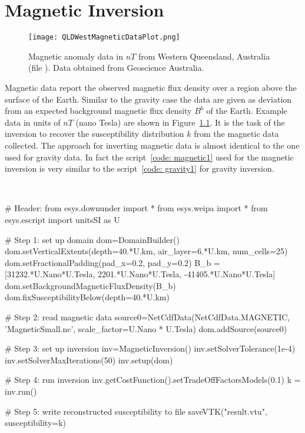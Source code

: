 \chapter{Magnetic Inversion}\label{Chp:cook:magnetic inversion}

\begin{figure}
\centering
\texttt{[image: QLDWestMagneticDataPlot.png]}
\caption{Magnetic anomaly data in $nT$ from Western Queensland, Australia
    (file ). Data obtained from Geoscience Australia.}
\label{FIG:P1:MAG:0}
\end{figure}

Magnetic data report the observed magnetic flux density over a region above the
surface of the Earth.
Similar to the gravity case the data are given as deviation from an expected
background magnetic flux density $B^b$ of the Earth.
Example data in units of $nT$ (nano Tesla) are shown in Figure~\ref{FIG:P1:MAG:0}.
It is the task of the inversion to recover the susceptibility distribution $k$
from the magnetic data collected. The approach for inverting magnetic data is
almost identical to the one used for gravity data. 
In fact the \downunder script~\ref{code: magnetic1} used for the magnetic
inversion is very similar to the script~\ref{code: gravity1} for gravity inversion.

\begin{pyc}\label{code: magnetic1}
\
\begin{python}
# Header:
from esys.downunder import *
from esys.weipa import *
from esys.escript import unitsSI as U


# Step 1: set up domain
dom=DomainBuilder()
dom.setVerticalExtents(depth=40.*U.km, air_layer=6.*U.km, num_cells=25)
dom.setFractionalPadding(pad_x=0.2, pad_y=0.2)
B_b = [31232.*U.Nano*U.Tesla, 2201.*U.Nano*U.Tesla, -41405.*U.Nano*U.Tesla]
dom.setBackgroundMagneticFluxDensity(B_b)
dom.fixSusceptibilityBelow(depth=40.*U.km)

# Step 2: read magnetic data
source0=NetCdfData(NetCdfData.MAGNETIC, 'MagneticSmall.nc', scale_factor=U.Nano * U.Tesla)
dom.addSource(source0)

# Step 3: set up inversion
inv=MagneticInversion()
inv.setSolverTolerance(1e-4)
inv.setSolverMaxIterations(50)
inv.setup(dom)

# Step 4: run inversion 
inv.getCostFunction().setTradeOffFactorsModels(0.1) 
k = inv.run()

# Step 5: write reconstructed susceptibility to file
saveVTK("result.vtu", susceptibility=k)
\end{python}
\end{pyc}

